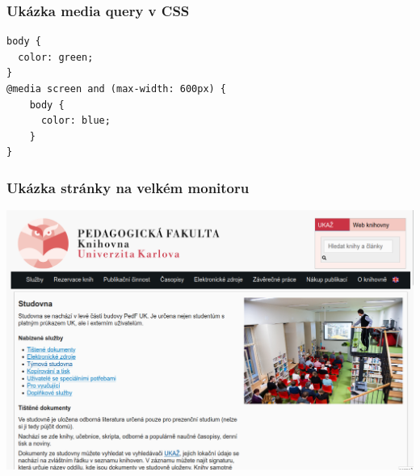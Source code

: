 \begin{frame}[fragile]
\frametitle{Ukázka media query v CSS}
\begin{verbatim}
body {
  color: green;
}
@media screen and (max-width: 600px) {
    body {
      color: blue;
    }
}
\end{verbatim}
          
\end{frame}

\begin{frame}
  \frametitle{Ukázka stránky na velkém monitoru}
  \begin{center}
    \includegraphics[height=.9\textheight]{img/pedf-web-big.png}
  \end{center}
\end{frame}

